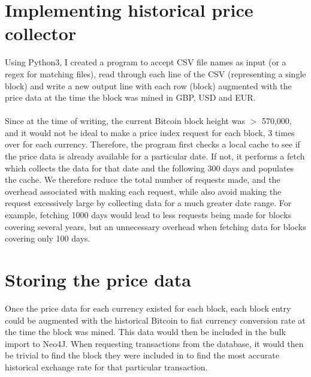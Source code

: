 \section{Implementing historical price collector}
Using Python3, I created a program to accept CSV file names as input (or a regex for matching files), read through each line of the CSV (representing a single block) and write a new output line with each row (block) augmented with the price data at the time the block was mined in GBP, USD and EUR. 
\\\\
Since at the time of writing, the current Bitcoin block height was $>$ 570,000, and it would not be ideal to make a price index request for each block, 3 times over for each currency. Therefore, the program first checks a local cache to see if the price data is already available for a particular date. If not, it performs a fetch which collects the data for that date and the following 300 days and populates the cache. We therefore reduce the total number of requests made, and the overhead associated with making each request, while also avoid making the request excessively large by collecting data for a much greater date range. For example, fetching 1000 days would lead to less requests being made for blocks covering several years, but an unnecessary overhead when fetching data for blocks covering only 100 days.

\section{Storing the price data}
Once the price data for each currency existed for each block, each block entry could be augmented with the historical Bitcoin to fiat currency conversion rate at the time the block was mined. This data would then be included in the bulk import to Neo4J. When requesting transactions from the database, it would then be trivial to find the block they were included in to find the most accurate historical exchange rate for that particular transaction. 